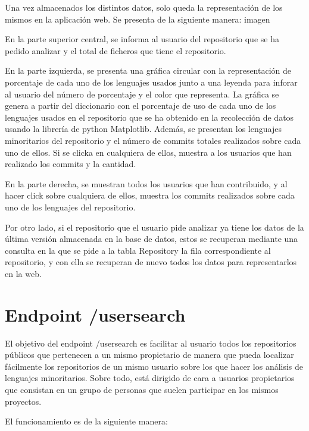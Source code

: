 \documentclass[a4paper, 12pt]{book}
\begin{document}
Una vez almacenados los distintos datos, solo queda la representación de los mismos en la aplicación web. Se presenta de la siguiente manera: {imagen}

En la parte superior central, se informa al usuario del repositorio que se ha pedido analizar y el total de ficheros que tiene el repositorio.

En la parte izquierda, se presenta una gráfica circular con la representación de porcentaje de cada uno de los lenguajes usados junto a una leyenda para inforar al usuario del número de porcentaje y el color que representa. La gráfica se genera a partir del diccionario con el porcentaje de uso de cada uno de los lenguajes usados en el repositorio que se ha obtenido en la recolección de datos usando la librería de python Matplotlib. Además, se presentan los lenguajes minoritarios del repositorio y el número de commits totales realizados sobre cada uno de ellos. Si se clicka en cualquiera de ellos, muestra a los usuarios que han realizado los commits y la cantidad.

En la parte derecha, se muestran todos los usuarios que han contribuido, y al hacer click sobre cualquiera de ellos, muestra los commits realizados sobre cada uno de los lenguajes del repositorio.

Por otro lado, si el repositorio que el usuario pide analizar ya tiene los datos de la última versión almacenada en la base de datos, estos se recuperan mediante una consulta en la que se pide a la tabla Repository la fila correspondiente al repositorio, y con ella se recuperan de nuevo todos los datos para representarlos en la web.

\section{Endpoint /usersearch} 
\label{sec:/usersearch}

El objetivo del endpoint /usersearch es facilitar al usuario todos los repositorios públicos que pertenecen a un mismo propietario de manera que pueda localizar fácilmente los repositorios de un mismo usuario sobre los que hacer los análisis de lenguajes minoritarios. Sobre todo, está dirigido de cara a usuarios propietarios que consistan en un grupo de personas que suelen participar en los mismos proyectos.

El funcionamiento es de la siguiente manera:
\end{document}

